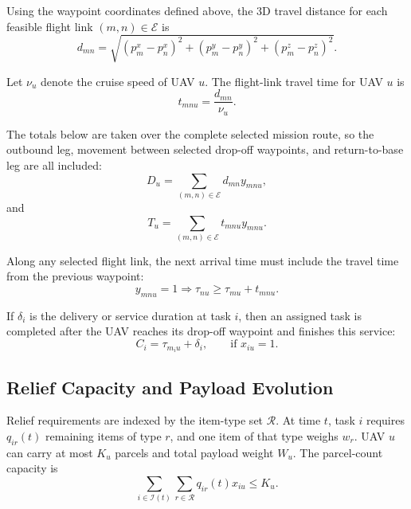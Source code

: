 \documentclass[conference]{IEEEtran}
\begin{document}
Using the waypoint coordinates defined above, the 3D travel distance for each feasible flight link $(m,n)\in\mathcal{E}$ is
\begin{equation}
d_{mn}
=
\sqrt{
(p_m^x-p_n^x)^2
+
(p_m^y-p_n^y)^2
+
(p_m^z-p_n^z)^2
}.
\end{equation}

Let $\nu_u$ denote the cruise speed of UAV $u$. The flight-link travel time for UAV $u$ is
\begin{equation}
t_{mnu}
=
\frac{d_{mn}}{\nu_u}.
\end{equation}

The totals below are taken over the complete selected mission route, so the outbound leg, movement between selected drop-off waypoints, and return-to-base leg are all included:
\begin{equation}
D_u
=
\sum_{(m,n)\in\mathcal{E}}
d_{mn}y_{mnu},
\end{equation}
and
\begin{equation}
T_u
=
\sum_{(m,n)\in\mathcal{E}}
t_{mnu}y_{mnu}.
\end{equation}

Along any selected flight link, the next arrival time must include the travel time from the previous waypoint:
\begin{equation}
y_{mnu}=1
\Rightarrow
\tau_{nu}
\geq
\tau_{mu}+t_{mnu}.
\end{equation}

If $\delta_i$ is the delivery or service duration at task $i$, then an assigned task is completed after the UAV reaches its drop-off waypoint and finishes this service:
\begin{equation}
C_i
=
\tau_{m_i u}+\delta_i,
\qquad
\text{if }x_{iu}=1.
\end{equation}

\subsection{Relief Capacity and Payload Evolution}

Relief requirements are indexed by the item-type set $\mathcal{R}$. At time $t$, task $i$ requires $q_{ir}(t)$ remaining items of type $r$, and one item of that type weighs $w_r$. UAV $u$ can carry at most $K_u$ parcels and total payload weight $W_u$. The parcel-count capacity is
\begin{equation}
\sum_{i\in\mathcal{I}(t)}
\sum_{r\in\mathcal{R}}
q_{ir}(t)x_{iu}
\leq
K_u.
\end{equation}
\end{document}
